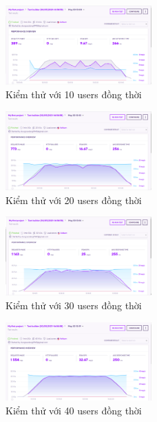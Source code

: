         \begin{figure}[!ht]
			\includegraphics[width=0.5\textwidth]{Images/testing/testing_10.png}
			\centering
			\linebreak
			\caption{Kiểm thử với 10 users đồng thời}
		\end{figure}
		\begin{figure}[!ht]
			\includegraphics[width=0.5\textwidth]{Images/testing/testing_20.png}
			\centering
			\linebreak
			\caption{Kiểm thử với 20 users đồng thời}
		\end{figure}
		\begin{figure}[!ht]
			\includegraphics[width=0.5\textwidth]{Images/testing/testing_30.png}
			\centering
			\linebreak
			\caption{Kiểm thử với 30 users đồng thời}
		\end{figure}
		\begin{figure}[!ht]
			\includegraphics[width=0.5\textwidth]{Images/testing/testing_40.png}
			\centering
			\linebreak
			\caption{Kiểm thử với 40 users đồng thời}
		\end{figure}
